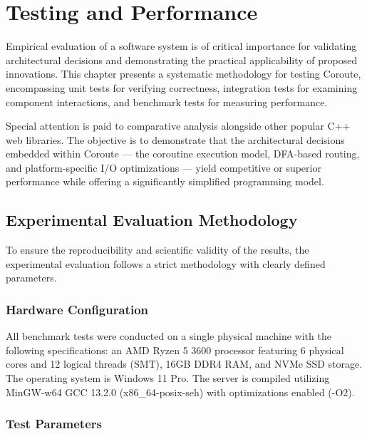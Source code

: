 \section{Testing and Performance}
\label{sec:testing}

Empirical evaluation of a software system is of critical importance for validating architectural decisions and demonstrating the practical applicability of proposed innovations. This chapter presents a systematic methodology for testing Coroute, encompassing unit tests for verifying correctness, integration tests for examining component interactions, and benchmark tests for measuring performance.

Special attention is paid to comparative analysis alongside other popular C++ web libraries. The objective is to demonstrate that the architectural decisions embedded within Coroute --- the coroutine execution model, DFA-based routing, and platform-specific I/O optimizations --- yield competitive or superior performance while offering a significantly simplified programming model.

\subsection{Experimental Evaluation Methodology}

To ensure the reproducibility and scientific validity of the results, the experimental evaluation follows a strict methodology with clearly defined parameters.

\subsubsection{Hardware Configuration}

All benchmark tests were conducted on a single physical machine with the following specifications: an AMD Ryzen 5 3600 processor featuring 6 physical cores and 12 logical threads (SMT), 16GB DDR4 RAM, and NVMe SSD storage. The operating system is Windows 11 Pro. The server is compiled utilizing MinGW-w64 GCC 13.2.0 (x86\_64-posix-seh) with optimizations enabled (-O2).

\subsubsection{Test Parameters}

